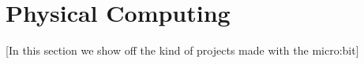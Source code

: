\section{Physical Computing}
\label{sec:domain}

[In this section we show off the kind of projects made with the micro:bit]




%
%
%
%
%
%
%
%
%
% 
%
%
%
%

